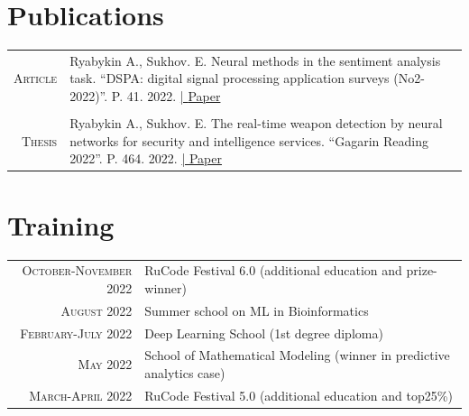 \documentclass[a4paper,10pt]{article} %
\begin{document}


\section{Publications}
\begin{center}
\begin{tabular}{r|p{11cm}}
    \textsc{Article} & Ryabykin A., Sukhov. E. 
    Neural methods in the sentiment analysis task.
    ``DSPA: digital signal processing application surveys (No2-2022)''. P. 41. 2022. \href{https://elibrary.ru/item.asp?id=48403884}{\hfill | \footnotesize{Paper}}\\ \multicolumn{2}{c}{}\\
    \textsc{Thesis} & Ryabykin A., Sukhov. E.
     The real-time weapon detection by neural networks for security and intelligence services. 
     ``Gagarin Reading 2022''. P. 464. 2022. \href{https://elibrary.ru/item.asp?id=49212462}{\hfill | \footnotesize Paper}\\
    
\end{tabular}
\end{center}

\section{Training}
\begin{tabular}{rp{10cm}}
    \textsc{October-November} 2022 & RuCode Festival 6.0 \footnotesize(additional education and prize-winner)\normalsize\\
    \textsc{August} 2022 & Summer school on ML in Bioinformatics\\

    \textsc{February-July} 2022 & Deep Learning School \footnotesize(1st degree diploma)\\

    \textsc{May} 2022 & School of Mathematical Modeling \footnotesize(winner in predictive analytics case)\normalsize\\

    \textsc{March-April} 2022 & RuCode Festival 5.0 \footnotesize(additional education and top25\%)\normalsize

    \end{tabular}
\end{document}
